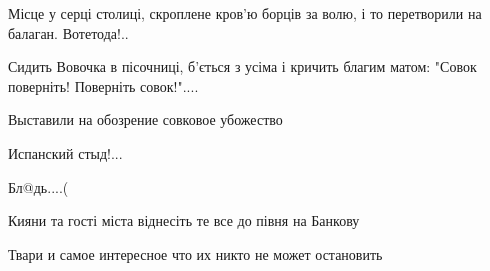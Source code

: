 \begin{itemize}
Місце у серці столиці, скроплене кров'ю борців за волю, і то перетворили на балаган. Вотетода!..

 
Сидить Вовочка в пісочниці, б'ється з усіма і кричить благим матом: "Совок поверніть! Поверніть совок!"....

 
Выставили на обозрение совковое убожество

 
Испанский стыд!...

 
Бл@дь....(

 
Кияни та гості міста віднесіть те все до півня на Банкову

 
Твари и самое интересное что их никто не может остановить

 


\end{itemize}
